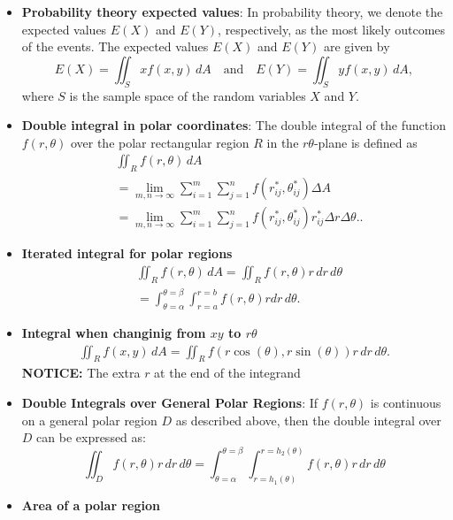 \documentclass{report}
\begin{document}
\begin{itemize}
        \item \textbf{Probability theory expected values}:
            In probability theory, we denote the expected values \(E(X)\) and \(E(Y)\), respectively, as the most likely outcomes of the events. The expected values \(E(X)\) and \(E(Y)\) are given by
            \[
                E(X) = \iint_S x f(x,y) \, dA \quad \text{and} \quad E(Y) = \iint_S y f(x,y) \, dA,
            \]
            where \(S\) is the sample space of the random variables \(X\) and \(Y\).
        \item \textbf{Double integral in polar coordinates}:
            The double integral of the function $f(r,\theta)$ over the polar rectangular region $R$ in the $r\theta$-plane is defined as
            \begin{align*}
                &\iint_R f(r,\theta) \, dA  \\
                &= \lim_{m,n \to \infty} \sum_{i=1}^{m} \sum_{j=1}^{n} f(r^*_{ij}, \theta^*_{ij}) \Delta A  \\
                &= \lim_{m,n \to \infty} \sum_{i=1}^{m} \sum_{j=1}^{n} f(r^*_{ij}, \theta^*_{ij}) r^*_{ij} \Delta r \Delta \theta.
            .\end{align*}
        \item \textbf{Iterated integral for polar regions}
            \begin{align*}
                &\iint_R f(r,\theta )\, dA = \iint_R f(r,\theta )r \, dr \, d\theta \\
                &=\int_{\theta =\alpha}^{\theta =\beta} \int_{r=a}^{r=b}f(r,\theta )r dr\, d\theta 
            .\end{align*}
        \item \textbf{Integral when changinig from $xy$ to $r\theta$ }
            \begin{align*}
                \iint_R f(x,y)\, dA = \iint_R f(r\cos{\left(\theta \right)}, r\sin{\left(\theta \right)})r\, dr\, d\theta 
            .\end{align*}
            \textbf{NOTICE:} The extra $r$ at the end of the integrand
        \item \textbf{Double Integrals over General Polar Regions}:
            If $f(r,\theta)$ is continuous on a general polar region $D$ as described above, then the double integral over $D$ can be expressed as:
            \[
                \iint_D f(r,\theta) r \, dr \, d\theta = \int_{\theta=\alpha}^{\theta=\beta} \int_{r=h_1(\theta)}^{r=h_2(\theta)} f(r,\theta) r \, dr \, d\theta
            \]
        \item \textbf{Area of a polar region}

\end{itemize}
\end{document}
